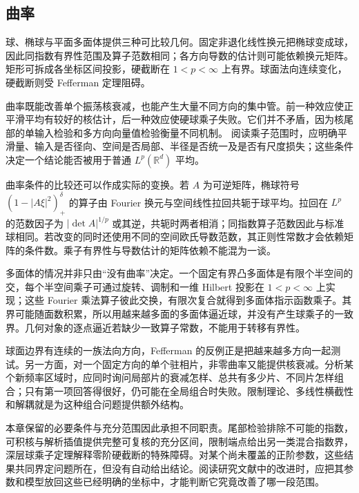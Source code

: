 \subsection{曲率}
\label{b2:subsec:240404}

球、椭球与平面多面体提供三种可比较几何。固定非退化线性换元把椭球变成球，因此同指数有界性范围及算子范数相同；各方向导数的估计则可能依赖换元矩阵。矩形可拆成各坐标区间投影，硬截断在 \(1<p<\infty\) 上有界。球面法向连续变化，硬截断则受 Fefferman 定理阻碍。

\ProseParagraphBreak
曲率既能改善单个振荡核衰减，也能产生大量不同方向的集中管。前一种效应使正平滑平均有较好的核估计，后一种效应使硬球乘子失败。它们并不矛盾，因为核尾部的单输入检验和多方向向量值检验衡量不同机制。
阅读乘子范围时，应明确平滑量、输入是否径向、空间是否局部、半径是否统一及是否有尺度损失；这些条件决定一个结论能否被用于普通 \(L^p(\mathbb R^d)\) 平均。

曲率条件的比较还可以作成实际的变换。若 \(A\) 为可逆矩阵，椭球符号 \((1-|A\xi|^2)_+^\delta\) 的算子由 Fourier 换元与空间线性拉回共轭于球平均。拉回在 \(L^p\) 的范数因子为 \(|\det A|^{1/p}\) 或其逆，共轭时两者相消；同指数算子范数因此与标准球相同。若改变的同时还使用不同的空间欧氏导数范数，其正则性常数才会依赖矩阵的条件数。乘子有界性与导数估计的矩阵依赖不能混为一谈。

\ProseParagraphBreak

多面体的情况并非只由“没有曲率”决定。一个固定有界凸多面体是有限个半空间的交，每个半空间乘子可通过旋转、调制和一维 Hilbert 投影在 \(1<p<\infty\) 上实现；这些 Fourier 乘法算子彼此交换，有限次复合就得到多面体指示函数乘子。其界可能随面数积累，所以用越来越多面的多面体逼近球，并没有产生球乘子的一致界。几何对象的逐点逼近若缺少一致算子常数，不能用于转移有界性。

\ProseParagraphBreak

球面边界有连续的一族法向方向，Fefferman 的反例正是把越来越多方向一起测试。另一方面，对一个固定方向的单个驻相片，非零曲率又能提供核衰减。分析某个新频率区域时，应同时询问局部片的衰减怎样、总共有多少片、不同片怎样组合；只有第一项回答得很好，仍可能在全局组合时失败。限制理论、多线性横截性和解耦就是为这种组合问题提供额外结构。

\ProseParagraphBreak

本章保留的必要条件与充分范围因此承担不同职责。尾部检验排除不可能的指数，可积核与解析插值提供完整可复核的充分区间，限制端点给出另一类混合指数界，深层球乘子定理解释零阶硬截断的特殊障碍。对某个尚未覆盖的正阶参数，这些结果共同界定问题所在，但没有自动给出结论。阅读研究文献中的改进时，应把其参数和模型放回这些已经明确的坐标中，才能判断它究竟改善了哪一段范围。
